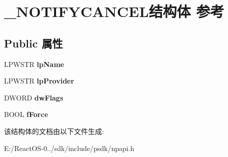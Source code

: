 \hypertarget{struct___n_o_t_i_f_y_c_a_n_c_e_l}{}\section{\+\_\+\+N\+O\+T\+I\+F\+Y\+C\+A\+N\+C\+E\+L结构体 参考}
\label{struct___n_o_t_i_f_y_c_a_n_c_e_l}
\subsection*{Public 属性}
\begin{DoxyCompactItemize}
\item 
\mbox{\label{struct___n_o_t_i_f_y_c_a_n_c_e_l_af9ca25fdcd41ba94af83dc16cdcf943c}} 
L\+P\+W\+S\+TR {\bfseries lp\+Name}
\item 
\mbox{\label{struct___n_o_t_i_f_y_c_a_n_c_e_l_a416f9799c942bbf8db8d6ed6b522c6b7}} 
L\+P\+W\+S\+TR {\bfseries lp\+Provider}
\item 
\mbox{\label{struct___n_o_t_i_f_y_c_a_n_c_e_l_a322a1e3ef7ff88c0eb06077fb208e0ad}} 
D\+W\+O\+RD {\bfseries dw\+Flags}
\item 
\mbox{\label{struct___n_o_t_i_f_y_c_a_n_c_e_l_abd43af8d4c2a5b857bb1b37d5d06b8fa}} 
B\+O\+OL {\bfseries f\+Force}
\end{DoxyCompactItemize}


该结构体的文档由以下文件生成\+:\begin{DoxyCompactItemize}
\item 
E\+:/\+React\+O\+S-\/0../sdk/include/psdk/npapi.\+h\end{DoxyCompactItemize}
